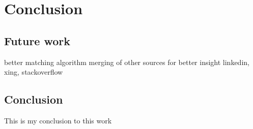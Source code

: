 \chapter{Conclusion}\label{ch:conclusion}
\section{Future work}
better matching algorithm
merging of other sources for better insight
linkedin, xing, stackoverflow

\section{Conclusion}

This is my conclusion to this work